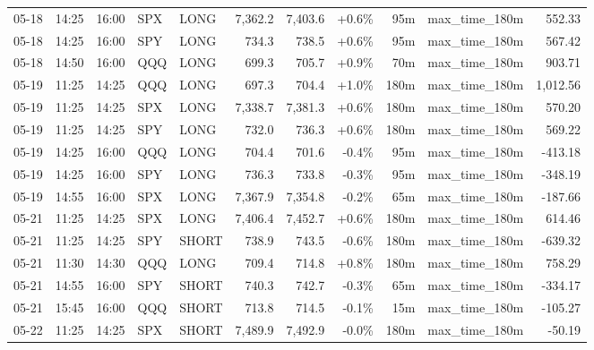 \documentclass[11pt,a4paper,twoside]{article}
\begin{document}
\begin{center}
\begin{longtable}{>{\color{txtmain}}l l l l l r r r r >{\color{txtmain}}l r}
05-18 & 14:25 & 16:00 & SPX & LONG & 7,362.2 & 7,403.6 & \textcolor{wingreen}{+0.6\%} & 95m & max\_time\_180m & \textcolor{wingreen}{552.33} \\
05-18 & 14:25 & 16:00 & SPY & LONG & 734.3 & 738.5 & \textcolor{wingreen}{+0.6\%} & 95m & max\_time\_180m & \textcolor{wingreen}{567.42} \\
05-18 & 14:50 & 16:00 & QQQ & LONG & 699.3 & 705.7 & \textcolor{wingreen}{+0.9\%} & 70m & max\_time\_180m & \textcolor{wingreen}{903.71} \\
05-19 & 11:25 & 14:25 & QQQ & LONG & 697.3 & 704.4 & \textcolor{wingreen}{+1.0\%} & 180m & max\_time\_180m & \textcolor{wingreen}{1,012.56} \\
05-19 & 11:25 & 14:25 & SPX & LONG & 7,338.7 & 7,381.3 & \textcolor{wingreen}{+0.6\%} & 180m & max\_time\_180m & \textcolor{wingreen}{570.20} \\
05-19 & 11:25 & 14:25 & SPY & LONG & 732.0 & 736.3 & \textcolor{wingreen}{+0.6\%} & 180m & max\_time\_180m & \textcolor{wingreen}{569.22} \\
05-19 & 14:25 & 16:00 & QQQ & LONG & 704.4 & 701.6 & \textcolor{lossred}{-0.4\%} & 95m & max\_time\_180m & \textcolor{lossred}{-413.18} \\
05-19 & 14:25 & 16:00 & SPY & LONG & 736.3 & 733.8 & \textcolor{lossred}{-0.3\%} & 95m & max\_time\_180m & \textcolor{lossred}{-348.19} \\
05-19 & 14:55 & 16:00 & SPX & LONG & 7,367.9 & 7,354.8 & \textcolor{lossred}{-0.2\%} & 65m & max\_time\_180m & \textcolor{lossred}{-187.66} \\
05-21 & 11:25 & 14:25 & SPX & LONG & 7,406.4 & 7,452.7 & \textcolor{wingreen}{+0.6\%} & 180m & max\_time\_180m & \textcolor{wingreen}{614.46} \\
05-21 & 11:25 & 14:25 & SPY & SHORT & 738.9 & 743.5 & \textcolor{lossred}{-0.6\%} & 180m & max\_time\_180m & \textcolor{lossred}{-639.32} \\
05-21 & 11:30 & 14:30 & QQQ & LONG & 709.4 & 714.8 & \textcolor{wingreen}{+0.8\%} & 180m & max\_time\_180m & \textcolor{wingreen}{758.29} \\
05-21 & 14:55 & 16:00 & SPY & SHORT & 740.3 & 742.7 & \textcolor{lossred}{-0.3\%} & 65m & max\_time\_180m & \textcolor{lossred}{-334.17} \\
05-21 & 15:45 & 16:00 & QQQ & SHORT & 713.8 & 714.5 & \textcolor{lossred}{-0.1\%} & 15m & max\_time\_180m & \textcolor{lossred}{-105.27} \\
05-22 & 11:25 & 14:25 & SPX & SHORT & 7,489.9 & 7,492.9 & \textcolor{lossred}{-0.0\%} & 180m & max\_time\_180m & \textcolor{lossred}{-50.19} \\

\end{longtable}
\end{center}
\end{document}
